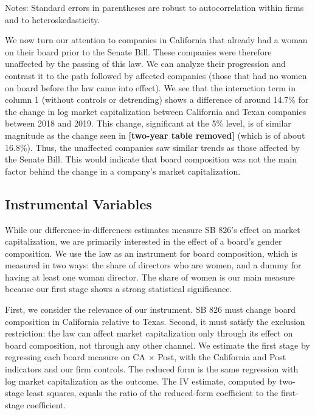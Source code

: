 \documentclass[12pt]{article}
\newcommand{\tablenotes}[1]{\par\vspace{4pt}\begin{minipage}{0.95\textwidth}\footnotesize #1\end{minipage}}
\begin{document}
\begin{table}[H]
\centering
\caption{Placebo test: firms with at least one woman on the board in 2018, same DiD as Table~\ref{tab:panel}}
\label{tab:placebo}
\small

\tablenotes{Notes: Standard errors in parentheses are robust to autocorrelation within firms and to heteroskedasticity.}
\end{table}

We now turn our attention to companies in California that already had a woman on their board prior to the Senate Bill. These companies were therefore unaffected by the passing of this law. We can analyze their progression and contrast it to the path followed by affected companies (those that had no women on board before the law came into effect). We see that the interaction term in column 1 (without controls or detrending) shows a difference of around 14.7\% for the change in log market capitalization between California and Texan companies between 2018 and 2019. This change, significant at the 5\% level, is of similar magnitude as the change seen in \textbf{[two-year table removed]} (which is of about 16.8\%). Thus, the unaffected companies saw similar trends as those affected by the Senate Bill. This would indicate that board composition was not the main factor behind the change in a company's market capitalization.

\subsection*{Instrumental Variables}

While our difference-in-differences estimates measure SB 826's effect on market capitalization, we are primarily interested in the effect of a board's gender composition. We use the law as an instrument for board composition, which is measured in two ways: the share of directors who are women, and a dummy for having at least one woman director. The share of women is our main measure because our first stage shows a strong statistical significance.

First, we consider the relevance of our instrument. SB 826 must change board composition in California relative to Texas. Second, it must satisfy the exclusion restriction: the law can affect market capitalization only through its effect on board composition, not through any other channel. We estimate the first stage by regressing each board measure on CA $\times$ Post, with the California and Post indicators and our firm controls. The reduced form is the same regression with log market capitalization as the outcome. The IV estimate, computed by two-stage least squares, equals the ratio of the reduced-form coefficient to the first-stage coefficient.
\end{document}

